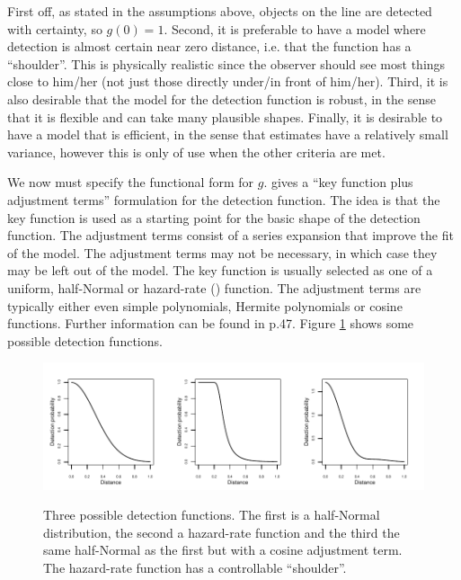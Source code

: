 First off, as stated in the assumptions above, objects on the line are detected with certainty, so $g(0)=1$. Second, it is preferable to have a model where detection is almost certain near zero distance, i.e. that the function has a ``shoulder''. This is physically realistic since the observer should see most things close to him/her (not just those directly under/in front of him/her). Third, it is also desirable that the model for the detection function is robust, in the sense that it is flexible and can take many plausible shapes. Finally, it is desirable to have a model that is efficient, in the sense that estimates have a relatively small variance, however this is only of use when the other criteria are met.

We now must specify the functional form for $g$.  gives a ``key function plus adjustment terms'' formulation for the detection function. The idea is that the key function is used as a starting point for the basic shape of the detection function. The adjustment terms consist of a series expansion that improve the fit of the model. The adjustment terms may not be necessary, in which case they may be left out of the model. The key function is usually selected as one of a uniform, half-Normal or hazard-rate (\cite{buckland85}) function. The adjustment terms are typically either even simple polynomials, Hermite polynomials or cosine functions. Further information can be found in  p.47. Figure \ref{ds-detfct-examples} shows some possible detection functions.

\begin{figure}
\centering
\includegraphics{intro/figs/detfct-examples.pdf}\\
\caption{Three possible detection functions. The first is a half-Normal distribution, the second a hazard-rate function and the third the same half-Normal as the first but with a cosine adjustment term. The hazard-rate function has a controllable ``shoulder''.}
\label{ds-detfct-examples}
\end{figure}

